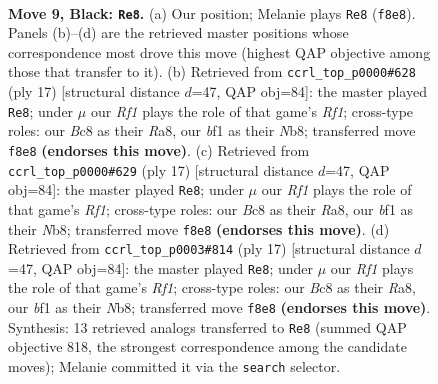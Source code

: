 \documentclass[11pt]{article}
\begin{document}
\clearpage

\begin{figure}[p]\centering
\begin{subfigure}{0.46\textwidth}\centering
\resizebox{\linewidth}{!}{%
\newchessgame
\chessboard[
  setfen={rnbq1rk1/pp3pbp/3p1np1/2pP4/P3PP1P/2N5/1P4P1/R1BQKBNR b KQ - 0 9},
  showmover=false,
  pgfstyle=straightmove, color=movearrow, markmove={f8-e8}
]}
\caption{}
\end{subfigure}\hfill
\begin{subfigure}{0.46\textwidth}\centering
\resizebox{\linewidth}{!}{%
\newchessgame
\chessboard[
  setfen={rnbq1rk1/pp3pbp/3p1np1/2pP4/4PP2/2N2N2/PP2B1PP/R1BQK2R b KQ - 0 9},
  showmover=false,
  pgfstyle=straightmove, color=movearrow, markmove={f8-e8}
]}
\caption{}
\end{subfigure}
\\[4pt]
\begin{subfigure}{0.46\textwidth}\centering
\resizebox{\linewidth}{!}{%
\newchessgame
\chessboard[
  setfen={rnbq1rk1/pp3pbp/3p1np1/2pP4/4PP2/2N2N2/PP2B1PP/R1BQK2R b KQ - 0 9},
  showmover=false,
  pgfstyle=straightmove, color=movearrow, markmove={f8-e8}
]}
\caption{}
\end{subfigure}\hfill
\begin{subfigure}{0.46\textwidth}\centering
\resizebox{\linewidth}{!}{%
\newchessgame
\chessboard[
  setfen={rnbq1rk1/pp3pbp/3p1np1/2pP4/4PP2/2N2N2/PP2B1PP/R1BQK2R b KQ - 0 9},
  showmover=false,
  pgfstyle=straightmove, color=movearrow, markmove={f8-e8}
]}
\caption{}
\end{subfigure}
\caption{\textbf{Move 9, Black: \texttt{Re8}.} (a) Our position; Melanie plays \texttt{Re8} (\texttt{f8e8}). Panels (b)--(d) are the retrieved master positions whose correspondence most drove this move (highest QAP objective among those that transfer to it). (b) Retrieved from \texttt{ccrl\_top\_p0000\#628} (ply 17) [structural distance $d$=47, QAP obj=84]: the master played \texttt{Re8}; under $\mu$ our \emph{Rf1} plays the role of that game's \emph{Rf1}; cross-type roles: our \emph{B}c8 as their \emph{R}a8, our \emph{b}f1 as their \emph{N}b8; transferred move \texttt{f8e8} \textbf{(endorses this move)}. (c) Retrieved from \texttt{ccrl\_top\_p0000\#629} (ply 17) [structural distance $d$=47, QAP obj=84]: the master played \texttt{Re8}; under $\mu$ our \emph{Rf1} plays the role of that game's \emph{Rf1}; cross-type roles: our \emph{B}c8 as their \emph{R}a8, our \emph{b}f1 as their \emph{N}b8; transferred move \texttt{f8e8} \textbf{(endorses this move)}. (d) Retrieved from \texttt{ccrl\_top\_p0003\#814} (ply 17) [structural distance $d$=47, QAP obj=84]: the master played \texttt{Re8}; under $\mu$ our \emph{Rf1} plays the role of that game's \emph{Rf1}; cross-type roles: our \emph{B}c8 as their \emph{R}a8, our \emph{b}f1 as their \emph{N}b8; transferred move \texttt{f8e8} \textbf{(endorses this move)}. Synthesis: 13 retrieved analogs transferred to \texttt{Re8} (summed QAP objective 818, the strongest correspondence among the candidate moves); Melanie committed it via the \texttt{search} selector.}
\label{fig:thought-m17}
\end{figure}
\end{document}
